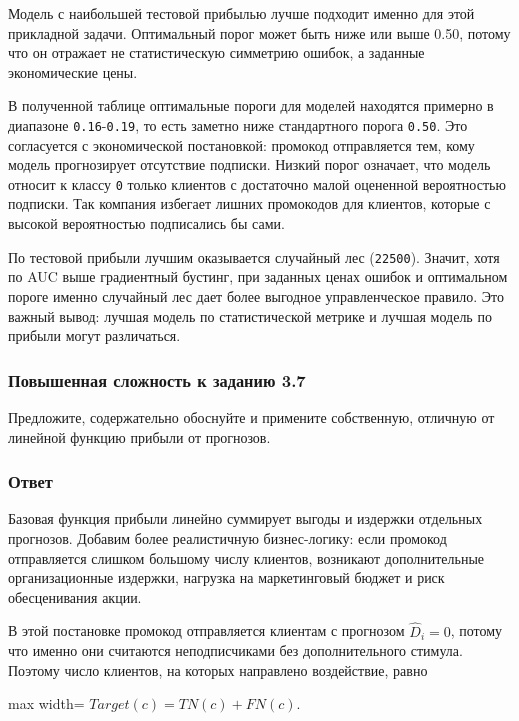 \documentclass[11pt]{article}
\begin{document}
    Модель с наибольшей тестовой прибылью лучше подходит именно для этой
прикладной задачи. Оптимальный порог может быть ниже или выше 0.50,
потому что он отражает не статистическую симметрию ошибок, а заданные
экономические цены.

В полученной таблице оптимальные пороги для моделей находятся примерно в
диапазоне \texttt{0.16}-\texttt{0.19}, то есть заметно ниже стандартного
порога \texttt{0.50}. Это согласуется с экономической постановкой:
промокод отправляется тем, кому модель прогнозирует отсутствие подписки.
Низкий порог означает, что модель относит к классу \texttt{0} только
клиентов с достаточно малой оцененной вероятностью подписки. Так
компания избегает лишних промокодов для клиентов, которые с высокой
вероятностью подписались бы сами.

По тестовой прибыли лучшим оказывается случайный лес (\texttt{22500}).
Значит, хотя по AUC выше градиентный бустинг, при заданных ценах ошибок
и оптимальном пороге именно случайный лес дает более выгодное
управленческое правило. Это важный вывод: лучшая модель по
статистической метрике и лучшая модель по прибыли могут различаться.

    \subsubsection{Повышенная сложность к заданию
3.7}\label{ux43fux43eux432ux44bux448ux435ux43dux43dux430ux44f-ux441ux43bux43eux436ux43dux43eux441ux442ux44c-ux43a-ux437ux430ux434ux430ux43dux438ux44e-3.7}

Предложите, содержательно обоснуйте и примените собственную, отличную от
линейной функцию прибыли от прогнозов.

\subsubsection{Ответ}

Базовая функция прибыли линейно суммирует выгоды и издержки отдельных
прогнозов. Добавим более реалистичную бизнес-логику: если промокод
отправляется слишком большому числу клиентов, возникают дополнительные
организационные издержки, нагрузка на маркетинговый бюджет и риск
обесценивания акции.

В этой постановке промокод отправляется клиентам с прогнозом
\(\hat D_i=0\), потому что именно они считаются неподписчиками без
дополнительного стимула. Поэтому число клиентов, на которых направлено
воздействие, равно

\begin{center}
\begin{adjustbox}{max width=\linewidth}
\(\displaystyle Target(c)=TN(c)+FN(c).\)
\end{adjustbox}
\end{center}
\end{document}
